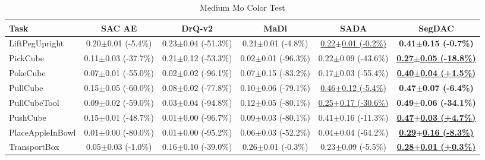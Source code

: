 \begin{table}[htbp]
\centering
\scriptsize
\caption{Medium Mo Color Test}
\label{tab:appendix_mocolortest_medium}
\begin{adjustbox}{max width=\textwidth}
\begin{tabular}{l*{5}{c}}
\toprule
\textbf{Task} & \textbf{SAC AE} & \textbf{DrQ-v2} & \textbf{MaDi} & \textbf{SADA} & \textbf{SegDAC} \\
\midrule
LiftPegUpright & 0.20$\pm$0.01 \scriptsize{(-5.4\%)} & 0.23$\pm$0.04 \scriptsize{(-51.3\%)} & 0.21$\pm$0.01 \scriptsize{(-4.8\%)} & \underline{0.22$\pm$0.01 \scriptsize{(-0.2\%)}} & \textbf{0.41$\pm$0.15 \scriptsize{(-0.7\%)}} \\
PickCube & 0.11$\pm$0.03 \scriptsize{(-37.7\%)} & 0.21$\pm$0.12 \scriptsize{(-53.3\%)} & 0.02$\pm$0.01 \scriptsize{(-96.3\%)} & 0.22$\pm$0.09 \scriptsize{(-43.6\%)} & \textbf{\underline{0.27$\pm$0.05 \scriptsize{(-18.8\%)}}} \\
PokeCube & 0.07$\pm$0.01 \scriptsize{(-55.0\%)} & 0.02$\pm$0.02 \scriptsize{(-96.1\%)} & 0.07$\pm$0.15 \scriptsize{(-83.2\%)} & 0.17$\pm$0.03 \scriptsize{(-55.4\%)} & \textbf{\underline{0.40$\pm$0.04 \scriptsize{(+1.5\%)}}} \\
PullCube & 0.15$\pm$0.05 \scriptsize{(-60.0\%)} & 0.08$\pm$0.02 \scriptsize{(-77.8\%)} & 0.10$\pm$0.06 \scriptsize{(-79.1\%)} & \underline{0.46$\pm$0.12 \scriptsize{(-5.4\%)}} & \textbf{0.47$\pm$0.07 \scriptsize{(-6.4\%)}} \\
PullCubeTool & 0.09$\pm$0.02 \scriptsize{(-59.0\%)} & 0.03$\pm$0.04 \scriptsize{(-94.8\%)} & 0.12$\pm$0.05 \scriptsize{(-80.1\%)} & \underline{0.25$\pm$0.17 \scriptsize{(-30.6\%)}} & \textbf{0.49$\pm$0.06 \scriptsize{(-34.1\%)}} \\
PushCube & 0.15$\pm$0.01 \scriptsize{(-48.7\%)} & 0.01$\pm$0.00 \scriptsize{(-96.7\%)} & 0.09$\pm$0.03 \scriptsize{(-80.1\%)} & 0.41$\pm$0.16 \scriptsize{(-11.3\%)} & \textbf{\underline{0.47$\pm$0.03 \scriptsize{(+4.7\%)}}} \\
PlaceAppleInBowl & 0.01$\pm$0.00 \scriptsize{(-80.0\%)} & 0.01$\pm$0.00 \scriptsize{(-95.2\%)} & 0.06$\pm$0.03 \scriptsize{(-52.2\%)} & 0.04$\pm$0.04 \scriptsize{(-64.2\%)} & \textbf{\underline{0.29$\pm$0.16 \scriptsize{(-8.3\%)}}} \\
TransportBox & 0.05$\pm$0.03 \scriptsize{(-1.0\%)} & 0.16$\pm$0.10 \scriptsize{(-39.0\%)} & 0.26$\pm$0.01 \scriptsize{(-0.3\%)} & 0.23$\pm$0.09 \scriptsize{(-5.5\%)} & \textbf{\underline{0.28$\pm$0.01 \scriptsize{(+0.3\%)}}} \\
\bottomrule
\end{tabular}
\end{adjustbox}
\end{table}

